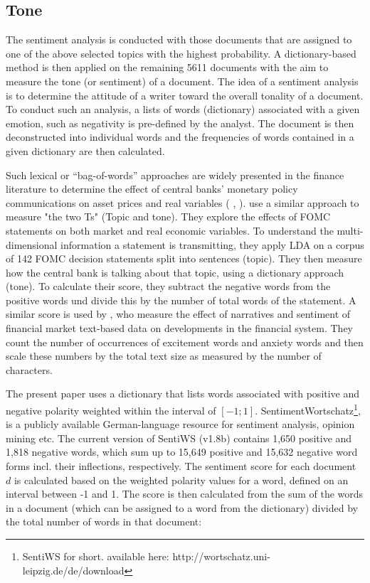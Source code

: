 \documentclass[12pt,a4paper,notitlepage]{article}
\begin{document}
\subsection{Tone}\label{subsection_tone}

The sentiment analysis is conducted with those documents that are assigned to one of the above selected topics with the highest probability. A dictionary-based method is then applied on the remaining 5611 documents with the aim to measure the tone (or sentiment) of a document. The idea of a sentiment analysis is to determine the attitude of a writer toward the overall tonality of a document. To conduct such an analysis, a lists of words (dictionary) associated with a given emotion, such as negativity is pre-defined by the analyst. The document is then deconstructed into individual words and the frequencies of words contained in a given dictionary are then calculated. 

Such lexical or “bag-of-words” approaches are widely presented in the finance literature to  determine  the  effect  of  central  banks’  monetary  policy  communications on asset prices and real variables (\citet{nyman_news_2018} \citep{tetlock_giving_2007}, \citep{tetlock_more_2008}). \citet{hansen_shocking_2016} use a similar approach to measure "the two Ts" (Topic and tone). They explore the effects of FOMC statements on both market and real economic variables. To understand the multi-dimensional information a statement is transmitting, they apply LDA on a corpus of 142 FOMC decision statements split into sentences (topic). They then measure how the central bank is talking about that topic, using a dictionary approach (tone). To calculate their score, they subtract the negative words from the positive words und divide this by the number of total words of the statement. A similar score is used by \citet{nyman_news_2018}, who measure the effect of narratives and sentiment of financial market text-based data on developments in the financial system. They count the number of occurrences of excitement words and anxiety words and then scale these numbers by the total text size as measured by the number of characters.

The present paper uses a dictionary that lists words associated with positive and negative polarity weighted within the interval of $[-1; 1]$. SentimentWortschatz\footnote{SentiWS for short. available here: http://wortschatz.uni-leipzig.de/de/download}, is a publicly available German-language resource for sentiment analysis, opinion mining etc. The current version of SentiWS (v1.8b) contains 1,650 positive and 1,818 negative words, which sum up to 15,649 positive and 15,632 negative word forms incl. their inflections, respectively. The sentiment score for each document $d$ is calculated  based on the weighted polarity values for a word, defined on an interval between -1 and 1. The score is then calculated from the sum of the words in a document (which can be assigned to a word from the dictionary) divided by the total number of words in that document:
 
\end{document}
